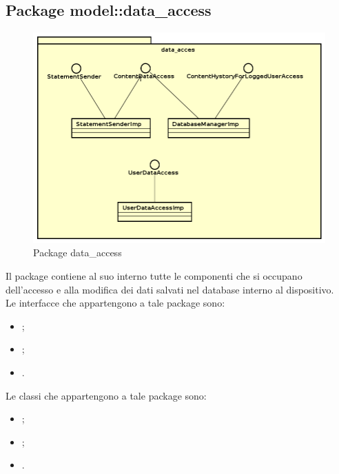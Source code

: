 \documentclass[../Tesi.tex]{subfiles}
\begin{document}
	\subsection{Package model::data\_access}
		\begin{figure}[H]
			\centering
			\includegraphics[scale=0.5]{images/package_diagrams/data_access}
				\caption{Package data\_access}
			\label{fig:StrutturaMVP}
		\end{figure}
		Il package  contiene al suo interno tutte le componenti che si occupano dell'accesso e alla modifica dei dati salvati nel database interno al dispositivo. \\
		Le interfacce che appartengono a tale package sono:
		\begin{itemize}
			\item {};
			\item {};
			\item {}.
		\end{itemize}
		Le classi che appartengono a tale package sono:
		\begin{itemize}
			\item {};
			\item {};
			\item {}.
		\end{itemize}
\end{document}
